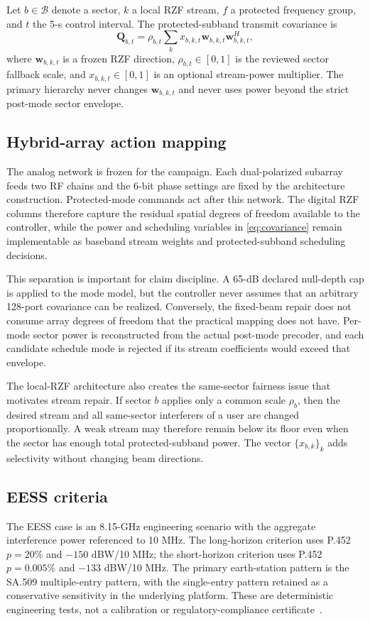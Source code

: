 \documentclass[journal]{IEEEtran}
\newcommand{\B}{\mathcal{B}}
\begin{document}
Let $b\in\B$ denote a sector, $k$ a local RZF stream, $f$ a protected frequency group, and $t$ the 5-s control interval. The protected-subband transmit covariance is
\begin{equation}
 \bm Q_{b,t}=\rho_{b,t}\sum_{k}x_{b,k,t}
 \bm w_{b,k,t}\bm w_{b,k,t}^{H},
 \label{eq:covariance}
\end{equation}
where $\bm w_{b,k,t}$ is a frozen RZF direction, $\rho_{b,t}\in[0,1]$ is the reviewed sector fallback scale, and $x_{b,k,t}\in[0,1]$ is an optional stream-power multiplier. The primary hierarchy never changes $\bm w_{b,k,t}$ and never uses power beyond the strict post-mode sector envelope.


\subsection{Hybrid-array action mapping}
The analog network is frozen for the campaign. Each dual-polarized subarray feeds two RF chains and the 6-bit phase settings are fixed by the architecture construction. Protected-mode commands act after this network. The digital RZF columns therefore capture the residual spatial degrees of freedom available to the controller, while the power and scheduling variables in \eqref{eq:covariance} remain implementable as baseband stream weights and protected-subband scheduling decisions.

This separation is important for claim discipline. A 65-dB declared null-depth cap is applied to the mode model, but the controller never assumes that an arbitrary 128-port covariance can be realized. Conversely, the fixed-beam repair does not consume array degrees of freedom that the practical mapping does not have. Per-mode sector power is reconstructed from the actual post-mode precoder, and each candidate schedule mode is rejected if its stream coefficients would exceed that envelope.

The local-RZF architecture also creates the same-sector fairness issue that motivates stream repair. If sector $b$ applies only a common scale $\rho_b$, then the desired stream and all same-sector interferers of a user are changed proportionally. A weak stream may therefore remain below its floor even when the sector has enough total protected-subband power. The vector $\{x_{b,k}\}_k$ adds selectivity without changing beam directions.



\subsection{EESS criteria}
The EESS case is an 8.15-GHz engineering scenario with the aggregate interference power referenced to 10 MHz. The long-horizon criterion uses P.452 $p=20\%$ and $-150$ dBW/10 MHz; the short-horizon criterion uses P.452 $p=0.005\%$ and $-133$ dBW/10 MHz. The primary earth-station pattern is the SA.509 multiple-entry pattern, with the single-entry pattern retained as a conservative sensitivity in the underlying platform. These are deterministic engineering tests, not a calibration or regulatory-compliance certificate~\cite{iturp452,itursa1027,itursa509}.
\end{document}
